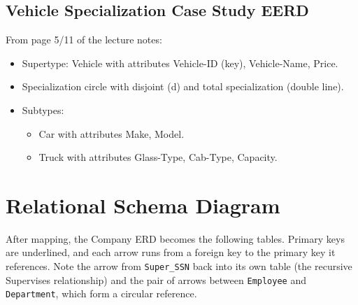 \documentclass[a4paper,11pt]{article}
\newenvironment{keepblock}
  {\par\noindent\begin{minipage}{\linewidth}\setlength{\parskip}{0.4em}}
  {\end{minipage}\par\bigskip}
\begin{document}
\begin{keepblock}
    \subsection{Vehicle Specialization Case Study EERD}
    From page 5/11 of the lecture notes:
    \begin{itemize}
        \item Supertype: Vehicle with attributes Vehicle-ID (key), Vehicle-Name, Price.
        \item Specialization circle with disjoint (d) and total specialization (double line).
        \item Subtypes:
              \begin{itemize}
                  \item Car with attributes Make, Model.
                  \item Truck with attributes Glass-Type, Cab-Type, Capacity.
              \end{itemize}
    \end{itemize}

    \begin{center}
        \centering
        \resizebox{0.8\textwidth}{!}{\VehicleEERD}
        \vspace{0.3cm}
    \end{center}
\end{keepblock}

\clearpage
\begin{keepblock}
    \section{Relational Schema Diagram}
    After mapping, the Company ERD becomes the following tables. Primary keys are underlined, and each arrow runs from a foreign key to the primary key it references. Note the arrow from \texttt{Super\_SSN} back into its own table (the recursive Supervises relationship) and the pair of arrows between \texttt{Employee} and \texttt{Department}, which form a circular reference.

    \begin{center}
        \centering
        \resizebox{\textwidth}{!}{\CompanySchema}
    \end{center}
\end{keepblock}
\end{document}
